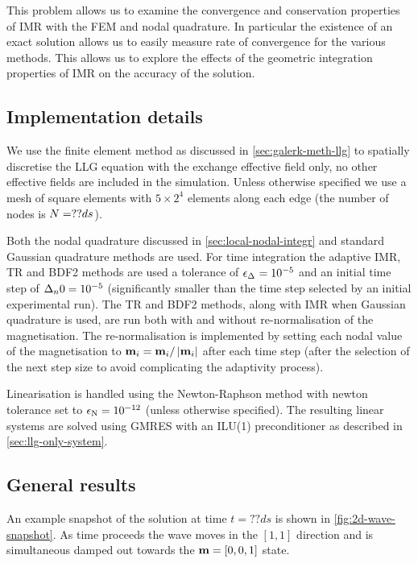 This problem allows us to examine the convergence and conservation properties of IMR with the FEM and nodal quadrature.
In particular the existence of an exact solution allows us to easily measure rate of convergence for the various methods.
This allows us to explore the effects of the geometric integration properties of IMR on the accuracy of the solution.


\subsection{Implementation details}
\label{sec:impl-deta}

We use the finite element method as discussed in \cref{sec:galerk-meth-llg} to spatially discretise the LLG equation with the exchange effective field only, no other effective fields are included in the simulation.
Unless otherwise specified we use a mesh of square elements with $5 \times 2^4$ elements along each edge (\ie the number of nodes is $N = ??ds$).

Both the nodal quadrature discussed in \cref{sec:local-nodal-integr} and standard Gaussian quadrature methods are used.
For time integration the adaptive IMR, TR and BDF2 methods are used a tolerance of $\epsilon_{\Delta_{}} = 10^{-5}$ and an initial time step of $\Delta_{n}{0} = 10^{-5}$ (significantly smaller than the time step selected by an initial experimental run).
The TR and BDF2 methods, along with IMR when Gaussian quadrature is used, are run both with and without re-normalisation of the magnetisation.
The re-normalisation is implemented by setting each nodal value of the magnetisation to $\boldsymbol{\mathrm{m}}_i = \boldsymbol{\mathrm{m}}_i/\left|{\boldsymbol{\mathrm{m}}_i} \right|$ after each time step (after the selection of the next step size to avoid complicating the adaptivity process).

Linearisation is handled using the Newton-Raphson method with newton tolerance set to $\epsilon_{\mathrm{N}} = 10^{-12}$ (unless otherwise specified).
The resulting linear systems are solved using GMRES with an ILU(1) preconditioner as described in \cref{sec:llg-only-system}.


\subsection{General results}

An example snapshot of the solution at time $t=??ds$ is shown in \cref{fig:2d-wave-snapshot}.
As time proceeds the wave moves in the $[1,1]$ direction and is simultaneous damped out towards the $\boldsymbol{\mathrm{m}} = [0,0,1]$ state.

